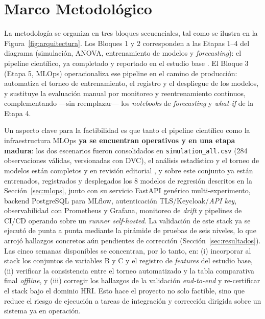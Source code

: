 \documentclass[conference]{IEEEtran}
\begin{document}
\section{Marco Metodológico}

La metodología se organiza en tres bloques secuenciales, tal como se ilustra en la Figura~\ref{fig:arquitectura}. Los Bloques 1 y 2 corresponden a las Etapas 1--4 del diagrama (simulación, ANOVA, entrenamiento de modelos y \textit{forecasting}): el pipeline científico, ya completado y reportado en el estudio base \cite{garcia2026}. El Bloque 3 (Etapa 5, MLOps) operacionaliza ese pipeline en el camino de producción: automatiza el torneo de entrenamiento, el registro y el despliegue de los modelos, y sustituye la evaluación manual por monitoreo y reentrenamiento continuos, complementando —sin reemplazar— los \textit{notebooks} de \textit{forecasting} y \textit{what-if} de la Etapa 4.

Un aspecto clave para la factibilidad es que tanto el pipeline científico como la infraestructura MLOps \textbf{ya se encuentran operativos y en una etapa madura}: los dos escenarios fueron consolidados en \texttt{simulation\_all.csv} (284 observaciones válidas, versionadas con DVC), el análisis estadístico y el torneo de modelos están completos y en revisión editorial \cite{garcia2026}, y sobre este conjunto ya están entrenados, registrados y desplegados los 8 modelos de regresión descritos en la Sección~\ref{sec:mlops}, junto con su servicio FastAPI genérico multi-experimento, backend PostgreSQL para MLflow, autenticación TLS/Keycloak/\textit{API key}, observabilidad con Prometheus y Grafana, monitoreo de \textit{drift} y pipelines de CI/CD operando sobre un \textit{runner self-hosted}. La validación de este stack ya se ejecutó de punta a punta mediante la pirámide de pruebas de seis niveles, lo que arrojó hallazgos concretos aún pendientes de corrección (Sección~\ref{sec:resultados}). Las cinco semanas disponibles se concentran, por lo tanto, en: (i) incorporar al stack los conjuntos de variables B y C y el registro de \textit{features} del estudio base, (ii) verificar la consistencia entre el torneo automatizado y la tabla comparativa final \textit{offline}, y (iii) corregir los hallazgos de la validación \textit{end-to-end} y re-certificar el stack bajo el dominio HRI. Esto hace el proyecto no solo factible, sino que reduce el riesgo de ejecución a tareas de integración y corrección dirigida sobre un sistema ya en operación.
\end{document}
